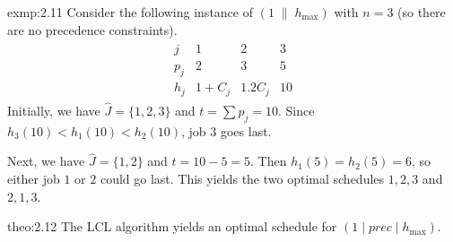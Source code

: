 \begin{exmp}{exmp:2.11}
    Consider the following instance of $(1\;\|\;h_{\max})$ with $n = 3$ 
    (so there are no precedence constraints). 
    \begin{align*}
        \begin{array}{c|ccc}
            j   & 1       & 2      & 3 \\ \hline
            p_j & 2       & 3      & 5 \\
            h_j & 1 + C_j & 1.2C_j & 10
        \end{array}
    \end{align*}
    Initially, we have $\hat J = \{1, 2, 3\}$ and $t = \sum p_j = 10$. 
    Since $h_3(10) < h_1(10) < h_2(10)$, job $3$ goes last. 

    Next, we have $\hat J = \{1, 2\}$ and $t = 10 - 5 = 5$. Then 
    $h_1(5) = h_2(5) = 6$, so either job $1$ or $2$ could go last. This 
    yields the two optimal schedules $1, 2, 3$ and $2, 1, 3$. 
\end{exmp}

\begin{theo}{theo:2.12}
    The LCL algorithm yields an optimal schedule for $(1 \mid prec \mid h_{\max})$. 
\end{theo}